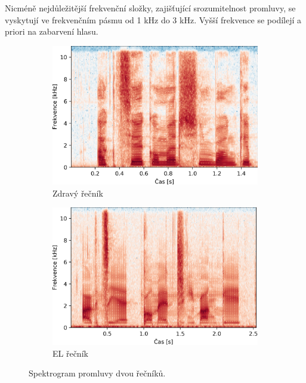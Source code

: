  Nicméně nejdůležitější frekvenční složky, zajišťující srozumitelnost promluvy, se vyskytují ve frekvenčním pásmu od 1 kHz do 3 kHz.
 Vyšší frekvence se podílejí a priori na zabarvení hlasu.

\begin{figure}[htpb]
  \centering
  \begin{subfigure}[b]{0.4\textwidth}
    \includegraphics[width=\textwidth]{./ch5-construction/img/spectrogram_normal.png}
    \caption{Zdravý řečník}
    \label{fig:construction:spectrogram:normal}
  \end{subfigure}
  \begin{subfigure}[b]{0.4\textwidth}
    \includegraphics[width=\textwidth]{./ch5-construction/img/spectrogram_el.png}
    \caption{EL řečník}
    \label{fig:construction:spectrogram:el}
  \end{subfigure}
  \caption{Spektrogram promluvy  dvou řečníků.}
  \label{fig:construction:spectrogram}
\end{figure}

